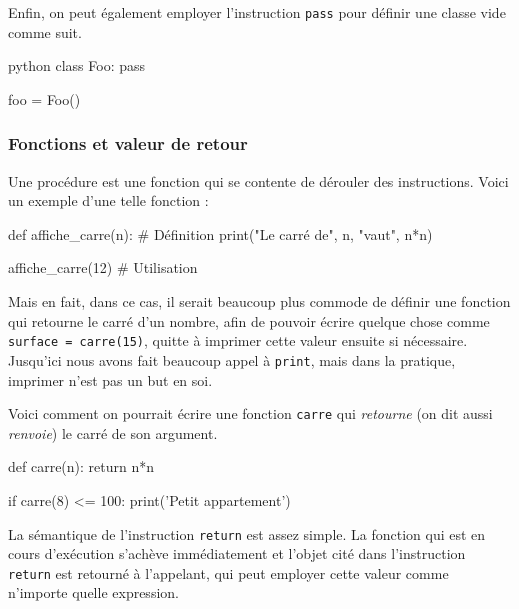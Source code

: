 Enfin, on peut également employer l'instruction \texttt{pass} pour définir une classe vide comme suit.

\begin{codebox}{python}
class Foo:
    pass
    
foo = Foo()
\end{codebox}

\subsubsection[Fonctions et valeur de retour]{Fonctions et valeur de retour}
\label{subsub:XI.3.3.2}

Une procédure est une fonction qui se contente de dérouler des instructions. Voici un exemple d'une telle fonction :

\begin{idleconsole}
\begin{pyconsole}
def affiche_carre(n): # Définition
    print("Le carré de", n, "vaut", n*n)

affiche_carre(12) # Utilisation
\end{pyconsole}
\end{idleconsole}

Mais en fait, dans ce cas, il serait beaucoup plus commode de définir une fonction qui retourne le carré d'un nombre, afin de pouvoir écrire quelque chose comme \texttt{surface = carre(15)}, quitte à imprimer cette valeur ensuite si nécessaire. Jusqu'ici nous avons fait beaucoup appel à \texttt{print}, mais dans la pratique, imprimer n'est pas un but en soi.

Voici comment on pourrait écrire une fonction \texttt{carre} qui \emph{retourne} (on dit aussi \emph{renvoie}) le carré de son argument.

\begin{idleconsole}
\begin{pyconsole}
def carre(n):
    return n*n

if carre(8) <= 100:
    print('Petit appartement')

\end{pyconsole}
\end{idleconsole}

La sémantique de l'instruction \texttt{return} est assez simple. La fonction qui est en cours d'exécution s'achève immédiatement et l'objet cité dans l'instruction \texttt{return} est retourné à l'appelant, qui peut employer cette valeur comme n'importe quelle expression.


